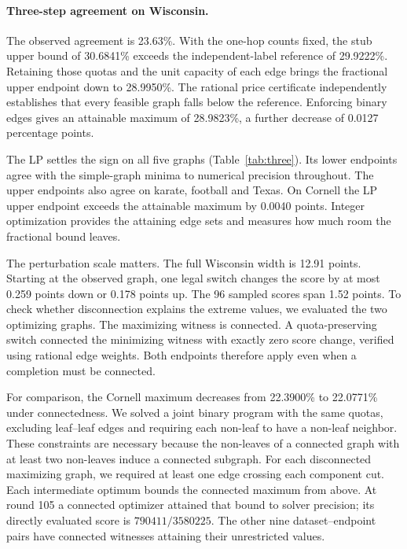 \documentclass[11pt]{article}
\begin{document}
\paragraph{Three-step agreement on Wisconsin.}
The observed agreement is 23.63\%. With the one-hop counts fixed, the stub upper bound of 30.6841\% exceeds the independent-label reference of 29.9222\%. Retaining those quotas and the unit capacity of each edge brings the fractional upper endpoint down to 28.9950\%. The rational price certificate independently establishes that every feasible graph falls below the reference. Enforcing binary edges gives an attainable maximum of 28.9823\%, a further decrease of 0.0127 percentage points.

The LP settles the sign on all five graphs (Table~\ref{tab:three}). Its lower endpoints agree with the simple-graph minima to numerical precision throughout. The upper endpoints also agree on karate, football and Texas. On Cornell the LP upper endpoint exceeds the attainable maximum by 0.0040 points. Integer optimization provides the attaining edge sets and measures how much room the fractional bound leaves.

The perturbation scale matters. The full Wisconsin width is 12.91 points. Starting at the observed graph, one legal switch changes the score by at most 0.259 points down or 0.178 points up. The 96 sampled scores span 1.52 points. To check whether disconnection explains the extreme values, we evaluated the two optimizing graphs. The maximizing witness is connected. A quota-preserving switch connected the minimizing witness with exactly zero score change, verified using rational edge weights. Both endpoints therefore apply even when a completion must be connected.

For comparison, the Cornell maximum decreases from 22.3900\% to 22.0771\% under connectedness. We solved a joint binary program with the same quotas, excluding leaf--leaf edges and requiring each non-leaf to have a non-leaf neighbor. These constraints are necessary because the non-leaves of a connected graph with at least two non-leaves induce a connected subgraph. For each disconnected maximizing graph, we required at least one edge crossing each component cut. Each intermediate optimum bounds the connected maximum from above. At round 105 a connected optimizer attained that bound to solver precision; its directly evaluated score is $790411/3580225$. The other nine dataset--endpoint pairs have connected witnesses attaining their unrestricted values.
\end{document}

